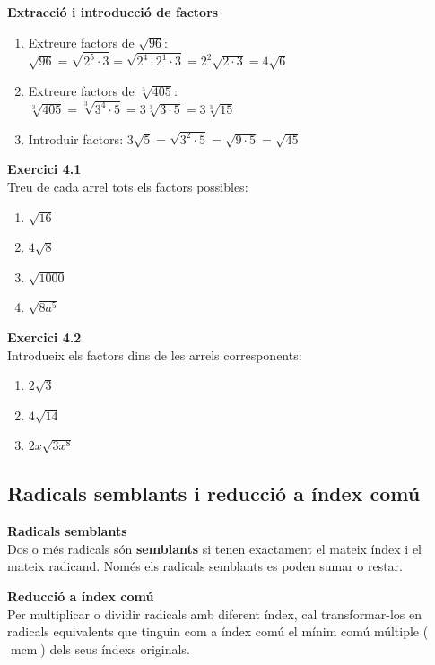 \documentclass[12pt]{article}
\begin{document}
\begin{exemple}
\textbf{Extracció i introducció de factors}
\begin{enumerate}[label=\alph*)]
    \item Extreure factors de $\sqrt{96}$: \\
    $\sqrt{96} = \sqrt{2^5 \cdot 3} = \sqrt{2^4 \cdot 2^1 \cdot 3} = 2^2 \sqrt{2 \cdot 3} = 4\sqrt{6}$
    \item Extreure factors de $\sqrt[3]{405}$: \\
    $\sqrt[3]{405} = \sqrt[3]{3^4 \cdot 5} = 3\sqrt[3]{3 \cdot 5} = 3\sqrt[3]{15}$
    \item Introduir factors: $3\sqrt{5} = \sqrt{3^2 \cdot 5} = \sqrt{9 \cdot 5} = \sqrt{45}$
\end{enumerate}
\end{exemple}

\begin{exercici}
\textbf{Exercici 4.1}\\
Treu de cada arrel tots els factors possibles:
\begin{enumerate}[label=\alph*)]
    \item $\sqrt{16}$
    \item $4\sqrt{8}$
    \item $\sqrt{1000}$
    \item $\sqrt{8a^5}$
\end{enumerate}
\end{exercici}

\begin{exercici}
\textbf{Exercici 4.2}\\
Introdueix els factors dins de les arrels corresponents:
\begin{enumerate}[label=\alph*)]
    \item $2\sqrt{3}$
    \item $4\sqrt{14}$
    \item $2x\sqrt{3x^8}$
\end{enumerate}
\end{exercici}

\subsection{Radicals semblants i reducció a índex comú}

\begin{concept}
\textbf{Radicals semblants}\\
Dos o més radicals són \textbf{semblants} si tenen exactament el mateix índex i el mateix radicand. Només els radicals semblants es poden sumar o restar.

\textbf{Reducció a índex comú}\\
Per multiplicar o dividir radicals amb diferent índex, cal transformar-los en radicals equivalents que tinguin com a índex comú el mínim comú múltiple ($\operatorname{mcm}$) dels seus índexs originals.
\end{concept}
\end{document}

